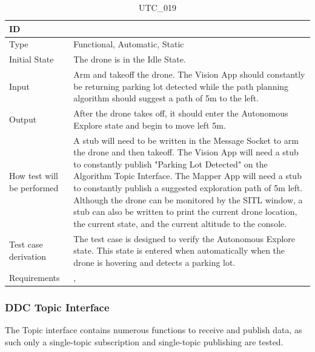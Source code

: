 \documentclass[12pt, titlepage]{article}
\begin{document}
\begin{table}[!h]
\begin{center}
\caption {UTC\_019}
\label{tab:UTC_019}
\begin{tabular}{ | m{3.2cm} | m{12.2cm} | } 
\hline
ID & \nameref{tab:UTC_019} \\ 
\hline
Type &  Functional, Automatic, Static  \\ 
\hline
Initial State & The drone is in the Idle State. \\ 
\hline
Input &  Arm and takeoff the drone. The Vision App should constantly be returning parking lot detected while the path planning algorithm should suggest a path of 5m to the left. \\ 
\hline
Output &  After the drone takes off, it should enter the Autonomous Explore state and begin to move left 5m.\\  
\hline
How test will be performed & A stub will need to be written in the Message Socket to arm the drone and then takeoff. The Vision App will need a stub to constantly publish "Parking Lot Detected" on the Algorithm Topic Interface. The Mapper App will need a stub to constantly publish a suggested exploration path of 5m left.  Although the drone can be monitored by the SITL window, a stub can also be written to print the current drone location, the current state, and the current altitude to the console.\\ 
\hline
Test case derivation &  The test case is designed to verify the Autonomous Explore state. This state is entered when automatically when the drone is hovering and detects a parking lot. \\ 
\hline
Requirements & \nameref{STA_003}, \nameref{TRANS_004} \\ 
\hline
\end{tabular}
\end{center}
\end{table}


\subsubsection{DDC Topic Interface}

The Topic interface contains numerous functions to receive and publish data, as such only a single-topic subscription and single-topic publishing are tested.
\end{document}
